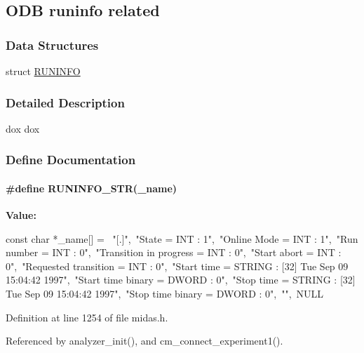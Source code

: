 \subsection{ODB runinfo related}
\label{group__modbh}
\subsubsection*{Data Structures}
\begin{DoxyCompactItemize}
\item 
struct \hyperlink{structRUNINFO}{RUNINFO}
\end{DoxyCompactItemize}


\subsubsection{Detailed Description}
dox dox 

\subsubsection{Define Documentation}
\paragraph[{RUNINFO\_\-STR}]{\setlength{\rightskip}{0pt plus 5cm}\#define RUNINFO\_\-STR(\_\-name)}\hfill\label{group__modbh_gae26d58f1036d07ca15fc73a991ccadc2}
{\bfseries Value:}
\begin{DoxyCode}
const char *_name[] = {\
"[.]",\
"State = INT : 1",\
"Online Mode = INT : 1",\
"Run number = INT : 0",\
"Transition in progress = INT : 0",\
"Start abort = INT : 0",\
"Requested transition = INT : 0",\
"Start time = STRING : [32] Tue Sep 09 15:04:42 1997",\
"Start time binary = DWORD : 0",\
"Stop time = STRING : [32] Tue Sep 09 15:04:42 1997",\
"Stop time binary = DWORD : 0",\
"",\
NULL }
\end{DoxyCode}


Definition at line 1254 of file midas.h.

Referenced by analyzer\_\-init(), and cm\_\-connect\_\-experiment1().